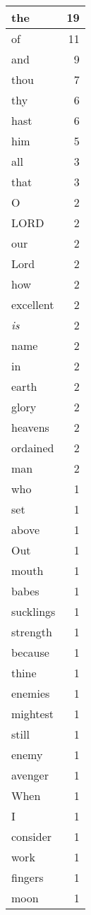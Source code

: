 \begin{center}
\begin{longtable}{l|r}
\hline \hline
\endlastfoot
the & 19 \\ \hline
of & 11 \\ \hline
and & 9 \\ \hline
thou & 7 \\ \hline
thy & 6 \\ \hline
hast & 6 \\ \hline
him & 5 \\ \hline
all & 3 \\ \hline
that & 3 \\ \hline
O & 2 \\ \hline
LORD & 2 \\ \hline
our & 2 \\ \hline
Lord & 2 \\ \hline
how & 2 \\ \hline
excellent & 2 \\ \hline
\emph{is} & 2 \\ \hline
name & 2 \\ \hline
in & 2 \\ \hline
earth & 2 \\ \hline
glory & 2 \\ \hline
heavens & 2 \\ \hline
ordained & 2 \\ \hline
man & 2 \\ \hline
who & 1 \\ \hline
set & 1 \\ \hline
above & 1 \\ \hline
Out & 1 \\ \hline
mouth & 1 \\ \hline
babes & 1 \\ \hline
sucklings & 1 \\ \hline
strength & 1 \\ \hline
because & 1 \\ \hline
thine & 1 \\ \hline
enemies & 1 \\ \hline
mightest & 1 \\ \hline
still & 1 \\ \hline
enemy & 1 \\ \hline
avenger & 1 \\ \hline
When & 1 \\ \hline
I & 1 \\ \hline
consider & 1 \\ \hline
work & 1 \\ \hline
fingers & 1 \\ \hline
moon & 1 \\ \hline

\end{longtable}
\end{center}
